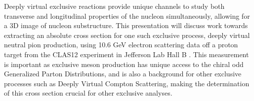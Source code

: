% 
% 
%




Deeply virtual exclusive reactions provide unique channels to study both transverse and longitudinal properties of the nucleon simultaneously, allowing for a 3D image of nucleon substructure. This presentation will discuss work towards extracting an absolute cross section for one such exclusive process, deeply virtual neutral pion production, using 10.6 GeV electron scattering data off a proton target from the CLAS12 experiment in Jefferson Lab Hall B . This measurement is important as exclusive meson production has unique access to the chiral odd Generalized Parton Distributions, and is also a background for other exclusive processes such as Deeply Virtual Compton Scattering, making the determination of this cross section crucial for other exclusive analyses.
